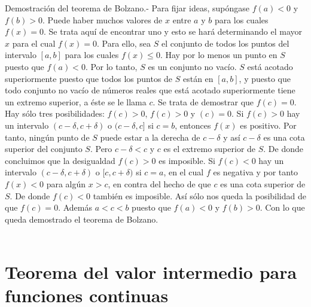 Demostración del teorema de Bolzano.- Para fijar ideas, supóngase $f(a)<0$ y $f(b)>0$. Puede haber muchos valores de $x$ entre $a$ y $b$ para los cuales $f(x)=0$. Se trata aquí de encontrar uno y esto se hará determinando el mayor $x$ para el cual $f(x)=0$. Para ello, sea $S$ el conjunto de todos los puntos del intervalo $[a,b]$ para los cuales $f(x)\leq 0$. Hay por lo menos un punto en $S$ puesto que $f(a)<0$. Por lo tanto, $S$ es un conjunto no vacío. $S$ está acotado superiormente puesto que todos los puntos de $S$ están en $[a,b]$, y puesto que todo conjunto no vacío de números reales que está acotado superiormente tiene un extremo superior, a éste se le llama $c$. Se trata de demostrar que $f(c)=0$.\\
Hay sólo tres posibilidades: $f(c)>0$, $f(c)>0$ y $(c)=0$. Si $f(c)>0$ hay un intervalo $(c-\delta,c+\delta)$  o $(c-\delta,c]$ si $c=b$, entonces $f(x)$ es positivo. Por tanto, ningún punto de $S$ puede estar a la derecha de $c-\delta$ y así $c-\delta$ es una cota superior del conjunto $S$. Pero $c-\delta < c$ y $c$ es el extremo superior de $S$. De donde concluimos que la desigualdad $f(c)>0$ es imposible. Si $f(c)<0$ hay un intervalo $(c-\delta,c+\delta)$ o $[c,c+\delta)$ si $c=a$, en el cual $f$ es negativa y por tanto $f(x)<0$ para algún $x>c$, en contra del hecho de que $c$ es una cota superior de $S$. De donde $f(c)<0$ también es imposible. Así sólo nos queda la posibilidad de que $f(c)=0$. Además $a<c<b$ puesto que $f(a)<0$ y $f(b)>0$. Con lo que queda demostrado el teorema de Bolzano.\\\\


\section{Teorema del valor intermedio para funciones continuas}

